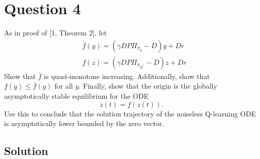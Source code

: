 \section*{Question 4}

As in proof of [1, Theorem 2], let
\[
    \begin{aligned}
         & \bar{f}(y)=\left(\gamma D P \Pi_{\pi_{y}}-D\right) y+D r           \\
         & \underline{f}(z)=\left(\gamma D P \Pi_{\pi_{Q^{*}}}-D\right) z+D r
    \end{aligned}
\]
Show that \( \bar{f} \) is quasi-monotone increasing.
Additionally, show that \( \underline{f}(y) \leq \bar{f}(y) \) for all \( y \).
Finally, show that the origin is the globally asymptotically stable equilibrium for the ODE
\[
    \dot{z}(t)=\underline{f}(z(t)) .
\]
Use this to conclude that the solution trajectory of the noiseless Q-learning ODE is asymptotically lower bounded by the zero vector.

\subsection*{Solution}

